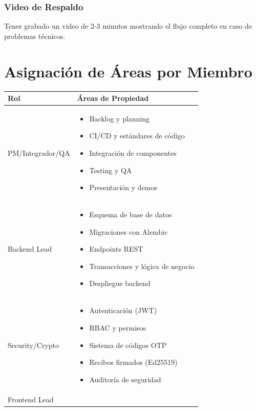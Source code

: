 \documentclass[12pt,a4paper]{article}
\begin{document}
\subsubsection{Video de Respaldo}
Tener grabado un video de 2-3 minutos mostrando el flujo completo en caso de problemas técnicos.

\section{Asignación de Áreas por Miembro}

\begin{table}[h]
\centering
\begin{tabular}{@{}lp{10cm}@{}}
\toprule
\textbf{Rol} & \textbf{Áreas de Propiedad} \\
\midrule
PM/Integrador/QA & 
\begin{itemize}[leftmargin=*, nosep]
    \item Backlog y planning
    \item CI/CD y estándares de código
    \item Integración de componentes
    \item Testing y QA
    \item Presentación y demos
\end{itemize} \\
\midrule
Backend Lead & 
\begin{itemize}[leftmargin=*, nosep]
    \item Esquema de base de datos
    \item Migraciones con Alembic
    \item Endpoints REST
    \item Transacciones y lógica de negocio
    \item Despliegue backend
\end{itemize} \\
\midrule
Security/Crypto & 
\begin{itemize}[leftmargin=*, nosep]
    \item Autenticación (JWT)
    \item RBAC y permisos
    \item Sistema de códigos OTP
    \item Recibos firmados (Ed25519)
    \item Auditoría de seguridad
\end{itemize} \\
\midrule
Frontend Lead & 
\begin{itemize}[leftmargin=*, nosep]

\end{itemize}
\end{tabular}
\end{table}
\end{document}
